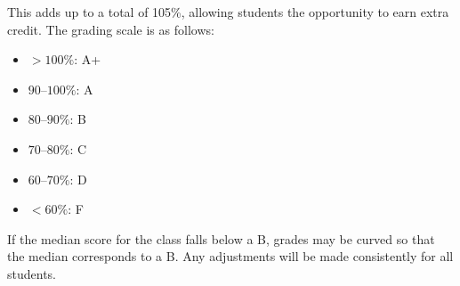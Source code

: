 This adds up to a total of 105\%, allowing students the opportunity to earn extra credit. The grading scale is as follows:

\begin{itemize}
    \item $>100\%$: A+
    \item $90$--$100\%$: A
    \item $80$--$90\%$: B
    \item $70$--$80\%$: C
    \item $60$--$70\%$: D
    \item $<60\%$: F
\end{itemize}

If the median score for the class falls below a B, grades may be curved so that the median corresponds to a B. Any adjustments will be made consistently for all students.

